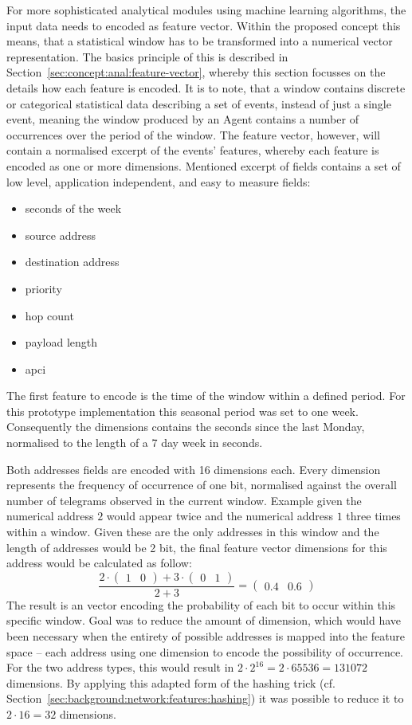 For more sophisticated analytical modules using machine learning algorithms, the input data needs to encoded as feature vector.
Within the proposed concept this means, that a statistical window has to be transformed into a numerical vector representation.
The basics principle of this is described in Section~\ref{sec:concept:anal:feature-vector}, whereby this section focusses on the details how each feature is encoded.
It is to note, that a window contains discrete or categorical statistical data describing a set of events, instead of just a single event, meaning the window produced by an Agent contains a number of occurrences over the period of the window.
The feature vector, however, will contain a normalised excerpt of the events' features, whereby each feature is encoded as one or more dimensions.
Mentioned excerpt of fields contains a set of low level, application independent, and easy to measure fields: 

\begin{itemize}
	\item seconds of the week
	\item source address
	\item destination address
	\item priority
	\item hop count
	\item payload length
	\item \gls{apci}
\end{itemize}

The first feature to encode is the time of the window within a defined period. For this prototype implementation this seasonal period was set to one week. Consequently the dimensions contains the seconds since the last Monday, normalised to the length of a 7 day week in seconds.

Both addresses fields are encoded with 16 dimensions each. Every dimension represents the frequency of occurrence of one bit, normalised against the overall number of telegrams observed in the current window.
Example given the numerical address $2$ would appear twice and the numerical address $1$ three times within a window. Given these are the only addresses in this window and the length of addresses would be 2 bit, the final feature vector dimensions for this address would be calculated as follow:
\[
\dfrac{2 \cdot \begin{pmatrix}1 & 0\end{pmatrix} + 3 \cdot \begin{pmatrix}0 & 1\end{pmatrix}}{2 + 3} = \begin{pmatrix}0.4 & 0.6\end{pmatrix}
\]
The result is an vector encoding the probability of each bit to occur within this specific window.
Goal was to reduce the amount of dimension, which would have been necessary when the entirety of possible addresses is mapped into the feature space -- each address using one dimension to encode the possibility of occurrence.
For the two address types, this would result in $2 \cdot 2^{16} = 2 \cdot 65536 = 131072$ dimensions. By applying this adapted form of the hashing trick (cf. Section~\ref{sec:background:network:features:hashing}) it was possible to reduce it to $2 \cdot 16 = 32$ dimensions.

